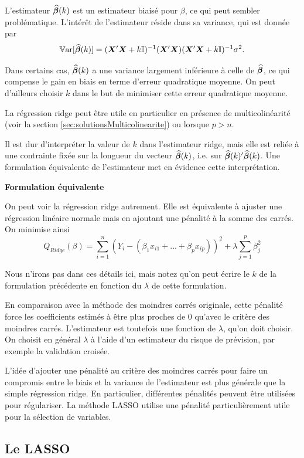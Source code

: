L'estimateur $\widehat{\bm\beta}(k)$ est un estimateur biaisé pour $\beta$, ce qui peut sembler problématique. L'intérêt de l'estimateur réside dans sa variance, qui est donnée par
$$\mathbb{V}\text{ar}[\widehat{\bm\beta}(k)]=(\bm{X}'\bm{X}+k\bm{\mathbb{I}})^{-1}(\bm{X}'\bm{X})(\bm{X}'\bm{X}+k\bm{\mathbb{I}})^{-1}\sigma^2.$$


Dans certains cas, $\widehat{\bm\beta}(k)$ a une variance largement inférieure à celle de $\widehat{\bm\beta}$, ce qui compense le gain en biais en terme d'erreur quadratique moyenne. On peut d'ailleurs choisir $k$ dans le but de minimiser cette erreur quadratique moyenne.

La régression ridge peut être utile en particulier en présence de multicolinéarité (voir la section \ref{sec:solutionsMulticolinearite}) ou lorsque $p>n$.

Il est dur d'interpréter la valeur de $k$ dans l'estimateur ridge, mais elle est reliée à une contrainte fixée sur la longueur du vecteur $\widehat{\bm\beta}(k)$, i.e. sur $\widehat{\bm\beta}(k)'\widehat{\bm\beta}(k)$. Une formulation équivalente de l'estimateur met en évidence cette interprétation.

\newpage

\textbf{Formulation équivalente}

On peut voir la régression ridge autrement. Elle est équivalente à ajuster une régression linéaire normale mais en ajoutant une pénalité à la somme des carrés. On minimise ainsi
$$ Q_{Ridge}(\beta) = \sum_{i=1}^n (Y_i - (\beta_1x_{i1}+...+\beta_px_{ip}))^2 + \lambda \sum_{j=1}^p \beta_j^2 $$

Nous n'irons pas dans ces détails ici, mais notez qu'on peut écrire le $k$ de la formulation précédente en fonction du $\lambda$ de cette formulation.

En comparaison avec la méthode des moindres carrés originale, cette pénalité force les coefficients estimés à être plus proches de 0 qu'avec le critère des moindres carrés. L'estimateur est toutefois une fonction de $\lambda$, qu'on doit choisir. On choisit en général $\lambda$ à l'aide d'un estimateur du risque de prévision, par exemple la validation croisée.

L'idée d'ajouter une pénalité au critère des moindres carrés pour faire un compromis entre le biais et la variance de l'estimateur est plus générale que la simple régression ridge. En particulier, différentes pénalités peuvent être utilisées pour régulariser. La méthode LASSO utilise une pénalité particulièrement utile pour la sélection de variables.

\subsection{Le LASSO}
\label{sub:lasso}


